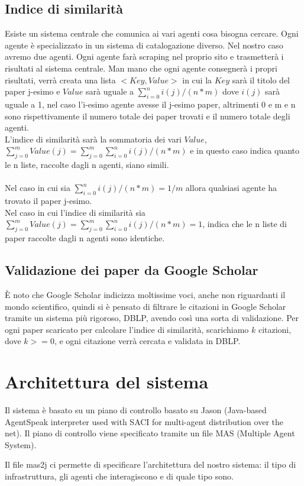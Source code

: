 \documentclass[12pt]{article}
\begin{document}
\subsection{Indice di similarit\`a}
Esiste un sistema centrale che comunica ai vari agenti cosa bisogna cercare. Ogni agente \`e specializzato in un sistema di catalogazione diverso. Nel nostro caso avremo due agenti. Ogni agente far\`a scraping nel proprio sito e trasmetter\`a i risultati al sistema centrale. Man mano che ogni agente consegner\`a i propri risultati, verr\`a creata una lista $<Key, Value>$ in cui la $Key$ sar\`a il titolo del paper j-esimo e $Value$ sar\`a uguale a $\displaystyle\sum\limits_{i=0}^n i(j)/(n*m)$ dove $i(j)$ sar\`a uguale a 1, nel caso l'i-esimo agente avesse il j-esimo paper, altrimenti 0 e m e n sono rispettivamente il numero totale dei paper trovati e il numero totale degli agenti.\\
L'indice di similarit\`a sar\`a la sommatoria dei vari $Value$, $\displaystyle\sum\limits_{j=0}^m Value(j) = \displaystyle\sum\limits_{j=0}^m \displaystyle\sum\limits_{i=0}^n i(j)/(n*m)$ e in questo caso indica quanto le n liste, raccolte dagli n agenti, siano simili. \\\\
Nel caso in cui sia $\displaystyle\sum\limits_{i=0}^n i(j)/(n*m) = 1/m$ allora qualsiasi agente ha trovato il paper j-esimo.\\
Nel caso in cui l'indice di similarit\`a sia $\displaystyle\sum\limits_{j=0}^m Value(j) = \displaystyle\sum\limits_{j=0}^m \displaystyle\sum\limits_{i=0}^n i(j)/(n*m) = 1$, indica che le n liste di paper raccolte dagli n agenti sono identiche.\\

\subsection{Validazione dei paper da Google Scholar}
\`E noto che Google Scholar indicizza moltissime voci, anche non riguardanti il mondo scientifico, quindi si \`e pensato di filtrare le citazioni in Google Scholar tramite un sistema pi\`u rigoroso, DBLP, avendo cos\`i una sorta di validazione. Per ogni paper scaricato per calcolare l'indice di similarit\`a, scarichiamo $k$ citazioni, dove $k >= 0$, e ogni citazione verr\`a cercata e validata in DBLP.

\section{Architettura del sistema}
Il sistema \`e basato su un piano di controllo basato su Jason (Java-based AgentSpeak interpreter used with SACI for multi-agent distribution over the net). Il piano di controllo viene specificato tramite un file MAS (Multiple Agent System).

Il file mas2j ci permette di specificare l'architettura del nostro sistema: il tipo di infrastruttura, gli agenti che interagiscono e di quale tipo sono.
\\
\end{document}

